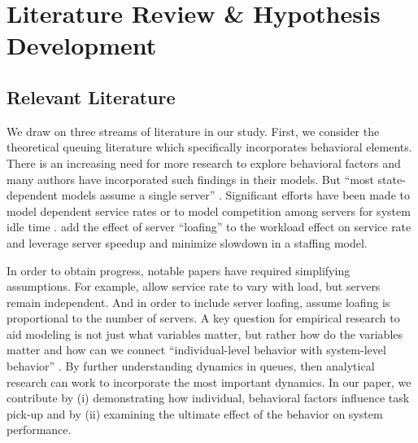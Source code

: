  
\section{Literature Review \& Hypothesis Development} \label{Lit_PU}
 \subsection{Relevant Literature} \label{reL_lit}
 We draw on three streams of literature in our study. First, we consider the theoretical queuing literature which specifically incorporates behavioral elements. There is an increasing need for more research to explore behavioral factors \citep{Armony2015} and many authors have incorporated such findings in their models. But “most state-dependent models assume a single server” \citep[p. 3]{Delasay2018}. Significant efforts have been made to model dependent service rates \citep{Chan2014, Dong2015} or to model competition among servers for system idle time \citep{Gopalakrishnan2016}. \cite{Do2018} add the effect of server “loafing” to the workload effect on service rate and \cite{Cho2019} leverage server speedup and minimize slowdown in a staffing model.
 
 In order to obtain progress, notable papers have required simplifying assumptions. For example, \cite{Chan2014} allow service rate to vary with load, but servers remain independent. And in order to include server loafing, \cite{Do2018} assume loafing is proportional to the number of servers. A key question for empirical research to aid modeling is not just what variables matter, but rather how do the variables matter and how can we connect “individual-level behavior with system-level behavior” \citep[p. 357]{Allon2019}. By further understanding dynamics in queues, then analytical research can work to incorporate the most important dynamics. In our paper, we contribute by (i) demonstrating how individual, behavioral factors influence task pick-up and by (ii) examining the ultimate effect of the behavior on system performance.
 
